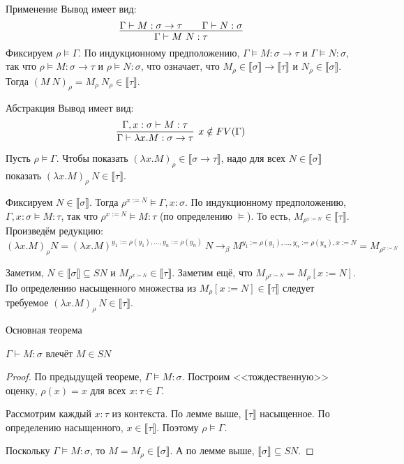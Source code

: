 \documentclass[aspectratio=169]{beamer}
\begin{document}
\begin{frame}{Применение}
Вывод имеет вид:
$$\infer{\Gamma\vdash M\ N:\tau}{\Gamma\vdash M:\sigma\rightarrow\tau\quad\quad\Gamma\vdash N:\sigma}$$
Фиксируем $\rho \models \Gamma$. По индукционному предположению, $\Gamma\models M:\sigma\rightarrow\tau$ и
$\Gamma\models N:\sigma$, так что $\rho\models M:\sigma\rightarrow\tau$ и $\rho\models N:\sigma$, что означает, что
$M_\rho \in \llbracket\sigma\rrbracket\rightarrow\llbracket\tau\rrbracket$ и $N_\rho \in \llbracket\sigma\rrbracket$.
Тогда $(M\ N)_\rho = M_\rho\ N_\rho \in \llbracket\tau\rrbracket$.
\end{frame}
\begin{frame}{Абстракция}
Вывод имеет вид:
$$\infer[x \notin FV(\Gamma)]{\Gamma\vdash\lambda x.M : \sigma\rightarrow\tau}{\Gamma,x:\sigma\vdash M:\tau}$$

Пусть $\rho\models\Gamma$.
Чтобы показать $(\lambda x.M)_\rho \in \llbracket\sigma\rightarrow\tau\rrbracket$, надо для всех $N \in \llbracket\sigma\rrbracket$
показать $(\lambda x.M)_\rho\ N \in \llbracket\tau\rrbracket$.

Фиксируем $N \in \llbracket\sigma\rrbracket$. Тогда $\rho^{x := N}\models\Gamma,x:\sigma$. 
По индукционному предположению, $\Gamma,x:\sigma\models M:\tau$, так что $\rho^{x := N}\models M:\tau$ (по определению $\models$).
То есть, $M_{\rho^{x := N}} \in \llbracket\tau\rrbracket$. Произведём редукцию:
$$(\lambda x.M)_\rho N = (\lambda x.M)^{y_1 := \rho(y_1), \dots, y_n := \rho(y_n)}\ N \rightarrow_\beta M^{y_1 := \rho(y_1), \dots, y_n := \rho(y_n), x:=N}
 = M_{\rho^{x := N}}$$

Заметим, $N \in \llbracket \sigma \rrbracket \subseteq SN$ и $M_{\rho^{x := N}} \in \llbracket\tau\rrbracket$.
Заметим ещё, что $M_{\rho^{x:=N}} = M_\rho[x := N]$.
По определению насыщенного множества из $M_\rho[x := N] \in \llbracket\tau\rrbracket$ следует требуемое $(\lambda x.M)_\rho\ N \in \llbracket\tau\rrbracket$.
\end{frame}
\begin{frame}{Основная теорема}
\begin{thm}$\Gamma\vdash M:\sigma$ влечёт $M \in SN$\end{thm}
\begin{proof}
По предыдущей теореме, $\Gamma\models M:\sigma$. Построим <<тождественную>> оценку, $\rho(x) = x$ для всех $x:\tau \in \Gamma$.

Рассмотрим каждый $x : \tau$ из контекста.
По лемме выше, $\llbracket\tau\rrbracket$ насыщенное. По определению насыщенного, $x \in \llbracket\tau\rrbracket$.
Поэтому $\rho\models\Gamma$.

Поскольку $\Gamma\models M:\sigma$, то $M = M_\rho \in \llbracket \sigma \rrbracket$. А по лемме выше, $\llbracket \sigma \rrbracket \subseteq SN$.
\end{proof}
\end{frame}
\end{document}
